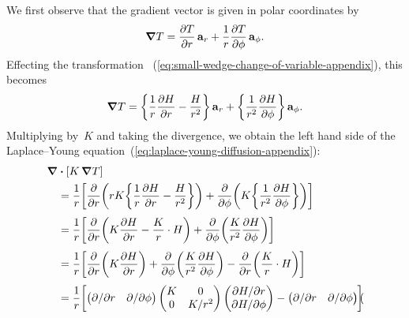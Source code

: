 We first observe that the gradient vector
is given in polar coordinates by
\begin{equation}
  \del T =
    \pder{T}{r} \basisvec{r} + \frac{1}{r} \pder{T}{\phi} \basisvec{\phi}.
  \label{eq:gradient-polar}
\end{equation}
Effecting the transformation~%
  (\ref{eq:small-wedge-change-of-variable-appendix}),
this becomes
\begin{equation}
  \del T =
    \curlybr*{\frac{1}{r} \pder{H}{r} - \frac{H}{r^2}} \basisvec{r}
      +
    \curlybr*{\frac{1}{r^2} \pder{H}{\phi}} \basisvec{\phi}.
  \label{eq:gradient-polar-change-of-variable}
\end{equation}
Multiplying by~$K$ and taking the divergence,
we obtain the left hand side
of the Laplace--Young equation~(\ref{eq:laplace-young-diffusion-appendix}):
\begin{align*}
  \del & \dotp \squarebr{K \del T} \\
  &=
    \frac{1}{r} \squarebr*{
      \pder{}{r} \roundbr*{
        r K \curlybr*{\frac{1}{r} \pder{H}{r} - \frac{H}{r^2}}
      }
        +
      \pder{}{\phi} \roundbr*{
        K \curlybr*{\frac{1}{r^2} \pder{H}{\phi}}
      }
    }
    \\[\tallspace]
  &=
    \frac{1}{r} \squarebr*{
      \pder{}{r} \roundbr*{K \pder{H}{r} - \frac{K}{r} \cdot H}
        +
      \pder{}{\phi} \roundbr*{\frac{K}{r^2} \pder{H}{\phi}}
    }
    \\[\tallspace]
  &=
    \frac{1}{r} \squarebr*{
      \pder{}{r} \roundbr*{K \pder{H}{r}}
        +
      \pder{}{\phi} \roundbr*{\frac{K}{r^2} \pder{H}{\phi}}
        -
      \pder{}{r} \roundbr*{\frac{K}{r} \cdot H}
    }
    \\[\tallspace]
  &=
    \frac{1}{r} \squarebr*{
      \begin{pmatrix}
        \pd / {\pd r} & \pd / {\pd\phi}
      \end{pmatrix}
      \begin{pmatrix}
        K  &  0 \\
        0  &  K / r^2
      \end{pmatrix}
      \begin{pmatrix}
        \pd H / {\pd r} \\
        \pd H / {\pd\phi}
      \end{pmatrix}
        -
      \begin{pmatrix}
        \pd / {\pd r} & \pd / {\pd\phi}
      \end{pmatrix}
      \begin{pmatrix}

\end{pmatrix}}
\end{align*}
